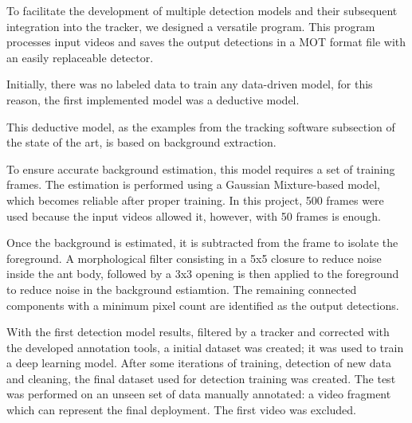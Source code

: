 
{
    To facilitate the development of multiple detection models and their subsequent integration into the tracker, we designed a versatile program. 
    This program processes input videos and saves the output detections in a MOT format file with an easily replaceable detector. 
}


{
    Initially, there was no labeled data to train any data-driven model, for this reason, the first implemented model was a deductive model.
}

{
    This deductive model, as the examples from the tracking software subsection of the state of the art, is based on background extraction.
}

{
    To ensure accurate background estimation, this model requires a set of training frames. 
    The estimation is performed using a Gaussian Mixture-based model, which becomes reliable after proper training. 
    In this project, 500 frames were used because the input videos allowed it, however, with 50 frames is enough.
}

{
    Once the background is estimated, it is subtracted from the frame to isolate the foreground. 
    A morphological filter consisting in a 5x5 closure to reduce noise inside the ant body, 
    followed by a 3x3 opening is then applied to the foreground to reduce noise in the background estiamtion. 
    The remaining connected components with a minimum pixel count are identified as the output detections.
}


\FloatBarrier

{
    With the first detection model results, filtered by a tracker and corrected with the developed annotation tools, a initial dataset was created; it was used to train a deep learning model.
    After some iterations of training, detection of new data and cleaning, the final dataset used for detection training was created. 
    The test was performed on an unseen set of data manually annotated: a video fragment which can represent the final deployment.
    The first video was excluded.
}

